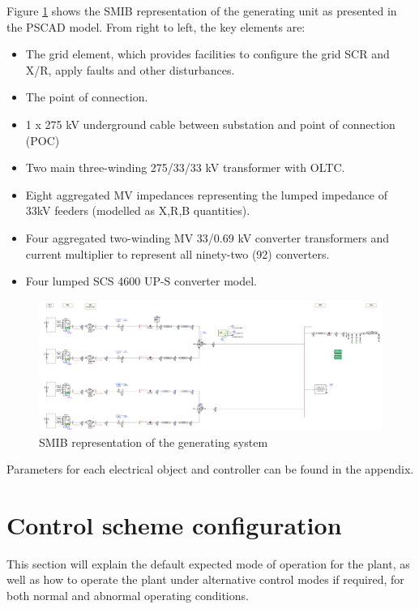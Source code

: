 \documentclass{../grid-link-report}
\begin{document}
	Figure \ref{fig:model-screenshot1} shows the SMIB representation of the generating unit as presented in the PSCAD model. From right to left, the key elements are:
	\begin{itemize}
		\item The grid element, which provides facilities to configure the grid \ac{SCR} and X/R, apply faults and other disturbances.
		\item The point of connection.
		\item 1 x 275 kV underground cable between substation and point of connection (POC)		
		\item Two main three-winding 275/33/33 kV transformer with OLTC.
		\item Eight aggregated MV impedances representing the lumped impedance of 33kV feeders (modelled as X,R,B quantities).
		\item Four aggregated two-winding MV 33/0.69 kV converter transformers and current multiplier to represent all ninety-two (92) converters.
		\item Four lumped SCS 4600 UP-S converter model. 			
	\end{itemize}

	
		\begin{figure}[H]
		\centering
		\includegraphics[width=\textwidth]{report-assets/images/pscad-model-layout1.png}
		\caption{SMIB representation of the generating system}
		\label{fig:model-screenshot1}
	\end{figure}
	
	Parameters for each electrical object and controller can be found in the appendix.

	\section{Control scheme configuration}
	

	 	This section will explain the default expected mode of operation for the plant, as well as how to operate the plant under alternative control modes if required, for both normal and abnormal operating conditions. 
	 	
\end{document}
